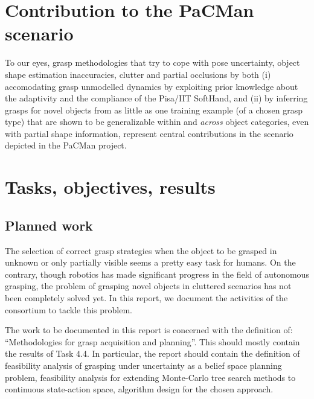 \documentclass[a4paper,11pt,pdf]{pacmanreport}
\begin{document}
\section*{Contribution to the PaCMan scenario}

To our eyes, grasp methodologies that try to cope with pose uncertainty, object shape estimation inaccuracies, clutter and partial occlusions by both (i) accomodating grasp unmodelled dynamics by exploiting prior knowledge about the adaptivity and the compliance of the Pisa/IIT SoftHand, and (ii) by inferring grasps for novel objects from as little as one training example (of a chosen grasp type) that are shown to be generalizable within and \emph{across} object categories, even with partial shape information, represent central contributions in the scenario depicted in the PaCMan project.


\newpage

\section{Tasks, objectives, results}

\subsection{Planned work}
The selection of correct grasp strategies when the object to be grasped in unknown or only partially visible seems a pretty easy task for humans.
On the contrary, though robotics has made significant progress in the field of autonomous grasping, the problem of grasping novel objects in cluttered scenarios has not been completely solved yet. In this report, we document the activities of the consortium to tackle this problem.

The work to be documented in this report is concerned with the definition of: ``Methodologies for grasp acquisition and planning''. This should mostly contain the results of Task 4.4. In particular, the report should contain the definition of feasibility analysis of grasping under uncertainty as a belief space planning problem, feasibility analysis for extending Monte-Carlo tree search methods to continuous state-action space, algorithm design for the chosen approach.

\end{document}
